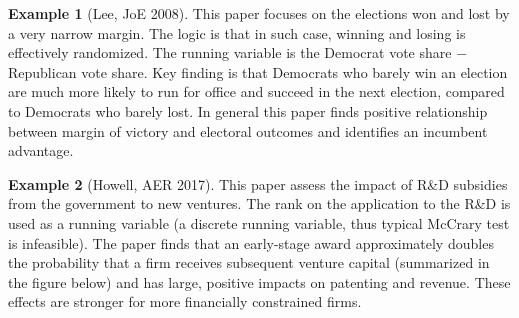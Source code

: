 \documentclass[12pt]{article}
\theoremstyle{definition}
\theoremstyle{property}
\theoremstyle{assumption}
\theoremstyle{example}
\newtheorem{example}{Example}[section]
\theoremstyle{comment}
\begin{document}
\begin{mdframed}[backgroundcolor=yellow!5] 
\begin{example}[Lee, JoE 2008] This paper focuses on the elections won and lost by a very narrow margin. The logic is that in such case, winning and losing is effectively randomized. The running variable is the Democrat vote share $-$ Republican vote share. Key finding is that Democrats who barely win an election are much more likely to run for office and succeed in the next election, compared to Democrats who barely lost. In general this paper finds positive relationship between margin of victory and electoral outcomes and identifies an incumbent advantage. 
\end{example}


\begin{example}[Howell, AER 2017] This paper assess the impact of R\&D subsidies from the government to new ventures. The rank on the application to the R\&D is used as a running variable (a discrete running variable, thus typical McCrary test is infeasible).  The paper finds that an early-stage award approximately doubles the probability that a firm receives subsequent venture capital (summarized in the figure below) and has large, positive impacts on patenting and revenue. These effects are stronger for more financially constrained firms.


\end{example}
\end{mdframed}
\end{document}
